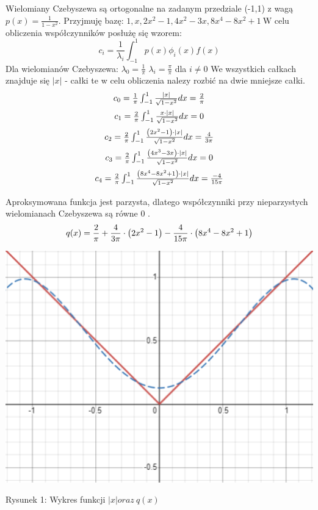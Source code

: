 \documentclass[5]{article}
\begin{document}
Wielomiany Czebyszewa są ortogonalne na zadanym przedziale (-1,1) z wagą $p(x)=\frac{1}{1-x^{2}}$. Przyjmuję bazę: $1, x, 2 x^{2}-1,4 x^{2}-3 x, 8 x^{4}-8 x^{2}+1 \mathrm{~W}$ celu obliczenia współczynników posłużę się wzorem:
$$
c_{i}=\frac{1}{\lambda_{i}} \int_{-1}^{1} p(x) \phi_{i}(x) f(x)
$$
Dla wielomianów Czebyszewa:
$\lambda_{0}=\frac{1}{\pi}$
$\lambda_{i}=\frac{\pi}{\pi}$ dla $i \neq 0$
We wszystkich całkach znajduje się $|x|$ - całki te w celu obliczenia nalezy rozbić na dwie mniejsze całki.
$$
\begin{array}{c}
\vspace{2mm}
c_{0}=\frac{1}{\pi} \int_{-1}^{1} \frac{|x|}{\sqrt{1-x^{2}}} d x=\frac{2}{\pi} \\
\vspace{2mm}
c_{1}=\frac{2}{\pi} \int_{-1}^{1} \frac{x \cdot|x|}{\sqrt{1-x^{2}}} d x=0 \\
\vspace{2mm}
c_{2}=\frac{2}{\pi} \int_{-1}^{1} \frac{\left(2 x^{2}-1\right) \cdot|x|}{\sqrt{1-x^{2}}} d x=\frac{4}{3 \pi} \\
\vspace{2mm}
c_{3}=\frac{2}{\pi} \int_{-1}^{1} \frac{\left(4 x^{3}-3 x\right) \cdot|x|}{\sqrt{1-x^{2}}} d x=0 \\
\vspace{2mm}
c_{4}=\frac{2}{\pi} \int_{-1}^{1} \frac{\left(8 x^{4}-8 x^{2}+1\right) \cdot|x|}{\sqrt{1-x^{2}}} d x=\frac{-4}{15 \pi}
\end{array}
$$
Aproksymowana funkcja jest parzysta, dlatego współczynniki przy nieparzystych wielomianach Czebyszewa są równe 0 .
$$
q(x)=\frac{2}{\pi}+\frac{4}{3 \pi} \cdot\left(2 x^{2}-1\right)-\frac{4}{15 \pi} \cdot\left(8 x^{4}-8 x^{2}+1\right)
\vspace{5mm}
$$

\hfil
\includegraphics[scale=0.5]{zad1.PNG} \par
\vspace{3mm}
\hfil{Rysunek 1: Wykres funkcji $\left | x \right | oraz \ q(x) $} \par
\end{document}
